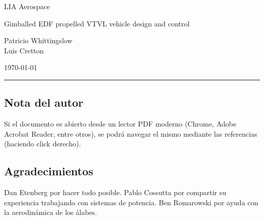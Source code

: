 \documentclass[11pt, titlepage]{article}
\author{Patricio Whittingslow \and Luis Cretton}
\begin{document}
\begin{titlepage}
	
	\centering
	{\small LIA Aerospace \par}
	
	
	\vspace{8cm}
	{\Huge Gimballed EDF propelled VTVL vehicle design and control  \par}
	\vspace{2cm}
	{ \large {
			Patricio Whittingslow \\ Luis Cretton 
		\par}}
	\vspace{4cm}
	\today
	
\end{titlepage}

\begin{abstract}
En este documento se encuentran descriptas las secuencias del diseño, simulación, pruebas, y puesta en marcha de un vehículo autónomo VTVL (Vertical Take-off Vertical Landing). Se desarrolla la elección de un método de propulsión que lograra ensayar el sistema de control a baja escala para luego ser puesto en marcha en un sistema de mayor escala de uso sub-orbital o incluso orbital.


\end{abstract}

\newpage
\tableofcontents
\newpage
\printunsrtglossaries
\vfill
\hrule
\vspace{-1cm}
\subsection*{Nota del autor}
Si el documento es abierto desde un lector PDF moderno (Chrome, Adobe Acrobat Reader, entre otros), se podrá navegar el mismo mediante las referencias (haciendo click derecho).
\newpage












\subsection*{Agradecimientos}
Dan Etenberg por hacer todo posible. Pablo Cossutta por compartir su experiencia trabajando con sistemas de potencia. Ben Romarowski por ayuda con la aerodinámica de los álabes.




% 
%
\end{document}
